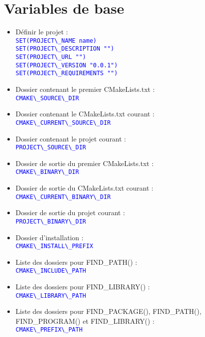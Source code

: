 \documentclass[a4paper,oneside]{article}
\begin{document}
\section{Variables de base}
\begin{itemize}
\item Définir le projet :\\
  \textcolor{blue}{\verb?SET(PROJECT\_NAME name)?}\\
  \textcolor{blue}{\verb?SET(PROJECT\_DESCRIPTION "")?}\\
  \textcolor{blue}{\verb?SET(PROJECT\_URL "")?}\\
  \textcolor{blue}{\verb?SET(PROJECT\_VERSION "0.0.1")?}\\
  \textcolor{blue}{\verb?SET(PROJECT\_REQUIREMENTS "")?}
\item Dossier contenant le premier CMakeLists.txt :\\
  \textcolor{blue}{\verb?CMAKE\_SOURCE\_DIR ?}
\item Dossier contenant le CMakeLists.txt courant :\\
  \textcolor{blue}{\verb?CMAKE\_CURRENT\_SOURCE\_DIR ?}
\item Dossier contenant le projet courant :\\
  \textcolor{blue}{\verb?PROJECT\_SOURCE\_DIR  ?}
\item Dossier de sortie du premier CMakeLists.txt :\\
  \textcolor{blue}{\verb?CMAKE\_BINARY\_DIR ?}
\item Dossier de sortie du CMakeLists.txt courant :\\
  \textcolor{blue}{\verb?CMAKE\_CURRENT\_BINARY\_DIR ?}
\item Dossier de sortie du projet courant :\\
  \textcolor{blue}{\verb?PROJECT\_BINARY\_DIR ?}
\item Dossier d'installation :\\
  \textcolor{blue}{\verb?CMAKE\_INSTALL\_PREFIX ?}
\item Liste des dossiers pour FIND\_PATH() :\\
  \textcolor{blue}{\verb?CMAKE\_INCLUDE\_PATH ?}
\item Liste des dossiers pour FIND\_LIBRARY() :\\
  \textcolor{blue}{\verb?CMAKE\_LIBRARY\_PATH ?}
\item Liste des dossiers pour FIND\_PACKAGE(), FIND\_PATH(), FIND\_PROGRAM() et FIND\_LIBRARY() :\\
  \textcolor{blue}{\verb?CMAKE\_PREFIX\_PATH ?}

\end{itemize}
\end{document}
